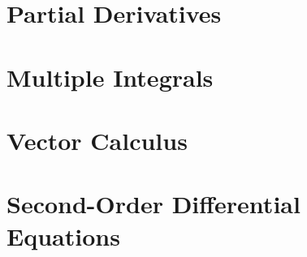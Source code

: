   \chapter{Partial Derivatives}
    
    
    
    
    
    
    
    

  \chapter{Multiple Integrals}
    
    
    
    
    
    
    
    
    

  \chapter{Vector Calculus}
    
    
    
    
    
    
    
    
    
    

  \chapter{Second-Order Differential Equations}
    
    
    
    


